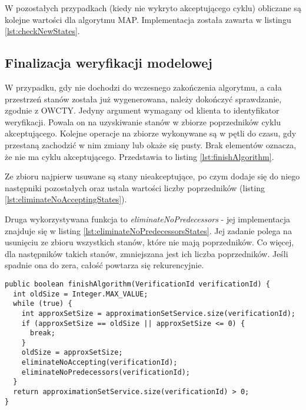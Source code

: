 W pozostałych przypadkach (kiedy nie wykryto akceptującego cyklu) obliczane są kolejne wartości dla algorytmu MAP. Implementacja została zawarta w listingu \ref{lst:checkNewStates}.


\subsection{Finalizacja weryfikacji modelowej}

W przypadku, gdy nie dochodzi do wczesnego zakończenia algorytmu, a cała przestrzeń stanów została już wygenerowana, należy dokończyć sprawdzanie, zgodnie z OWCTY.
Jedyny argument wymagany od klienta to identyfikator weryfikacji.
Powala on na uzyskiwanie stanów w zbiorze poprzedników cyklu akceptującego.
Kolejne operacje na zbiorze wykonywane są w pętli do czasu, gdy przestaną zachodzić w nim zmiany lub okaże się pusty.
Brak elementów oznacza, że nie ma cyklu akceptującego. 
Przedstawia to listing \ref{lst:finishAlgorithm}.

Ze zbioru najpierw usuwane są stany nieakceptujące, po czym dodaje się do niego następniki pozostałych oraz ustala wartości liczby poprzedników (listing \ref{lst:eliminateNoAcceptingStates}).

Druga wykorzystywana funkcja to \textit{eliminateNoPredecessors} - jej implementacja znajduje się w listing \ref{lst:eliminateNoPredecessorsStates}.
Jej zadanie polega na usunięciu ze zbioru wszystkich stanów, które nie mają poprzedników.
Co więcej, dla następników takich stanów, zmniejszana jest ich liczba poprzedników.
Jeśli spadnie ona do zera, całość powtarza się rekurencyjnie.

\begin{minipage}{\linewidth}
\begin{lstlisting}[caption={Kod obsługujący algorytm w przypadku, gdy nie zakończy się wcześniej.},captionpos=b,label={lst:finishAlgorithm}]
public boolean finishAlgorithm(VerificationId verificationId) {
  int oldSize = Integer.MAX_VALUE;
  while (true) {
    int approxSetSize = approximationSetService.size(verificationId);
    if (approxSetSize == oldSize || approxSetSize <= 0) {
      break;
    }
    oldSize = approxSetSize;
    eliminateNoAccepting(verificationId);
    eliminateNoPredecessors(verificationId);
  }
  return approximationSetService.size(verificationId) > 0;
}
\end{lstlisting}
\end{minipage}

